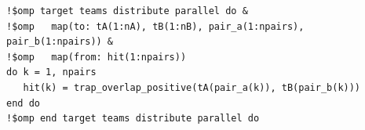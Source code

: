 \begin{lstlisting}[caption={Direct OpenMP GPU target pair kernel pattern reusing \texttt{trapezoid.f90}'s \texttt{!\$omp declare target} \texttt{trap\_overlap\_positive}.},label={lst:gpu_target}]
!$omp target teams distribute parallel do &
!$omp   map(to: tA(1:nA), tB(1:nB), pair_a(1:npairs), pair_b(1:npairs)) &
!$omp   map(from: hit(1:npairs))
do k = 1, npairs
   hit(k) = trap_overlap_positive(tA(pair_a(k)), tB(pair_b(k)))
end do
!$omp end target teams distribute parallel do
\end{lstlisting}
